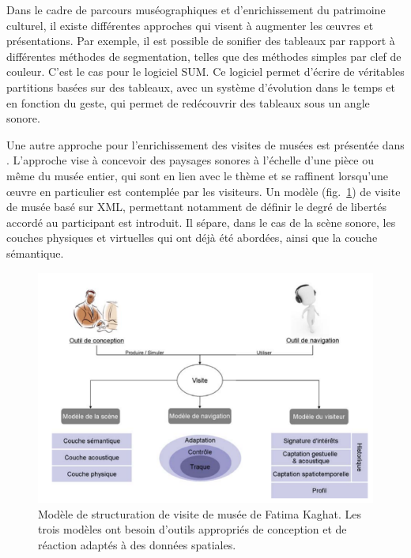 \documentclass[french,12pt]{article}
\begin{document}
Dans le cadre de parcours muséographiques et d'enrichissement du patrimoine culturel, il existe différentes approches qui visent à augmenter les œuvres et présentations. Par exemple, il est possible de sonifier des tableaux par rapport à différentes méthodes de segmentation, telles que des méthodes simples par clef de couleur. C'est le cas pour le logiciel SUM\cite{adhitya_composing_2012}.
Ce logiciel permet d'écrire de véritables partitions basées sur des tableaux, avec un système d'évolution dans le temps et en fonction du geste, qui permet de redécouvrir des tableaux sous un angle sonore.

Une autre approche pour l'enrichissement des visites de musées est présentée dans \cite{azough_modeet_2014}. L'approche vise à concevoir des paysages sonores à l'échelle d'une pièce ou même du musée entier, qui sont en lien avec le thème et se raffinent lorsqu'une œuvre en particulier est contemplée par les visiteurs. Un modèle (fig.~\ref{fig.visite.musee}) de visite de musée basé sur XML, permettant notamment de définir le degré de libertés accordé au participant est introduit. Il sépare, dans le cas de la scène sonore, les couches physiques et virtuelles qui ont déjà été abordées, ainsi que la couche sémantique.

\begin{figure}[h]
    \centering
    \includegraphics[scale=0.25]{images/modele_visite_musee.png}
    \caption{Modèle de structuration de visite de musée de Fatima Kaghat. Les trois modèles ont besoin d'outils appropriés de conception et de réaction adaptés à des données spatiales.}
    \label{fig.visite.musee}
\end{figure}
\end{document}
